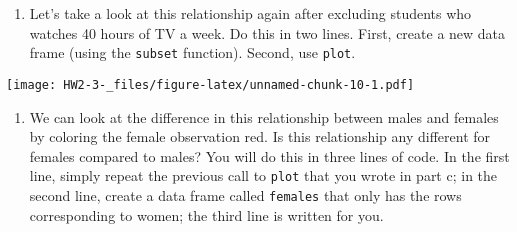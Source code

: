 \documentclass[]{article}
\newenvironment{Shaded}{\begin{snugshade}}{\end{snugshade}}
\newcommand{\CommentTok}[1]{\textcolor[rgb]{0.56,0.35,0.01}{\textit{#1}}}
\newcommand{\DataTypeTok}[1]{\textcolor[rgb]{0.13,0.29,0.53}{#1}}
\newcommand{\DecValTok}[1]{\textcolor[rgb]{0.00,0.00,0.81}{#1}}
\newcommand{\KeywordTok}[1]{\textcolor[rgb]{0.13,0.29,0.53}{\textbf{#1}}}
\newcommand{\NormalTok}[1]{#1}
\newcommand{\OperatorTok}[1]{\textcolor[rgb]{0.81,0.36,0.00}{\textbf{#1}}}
\newcommand{\StringTok}[1]{\textcolor[rgb]{0.31,0.60,0.02}{#1}}
\providecommand{\tightlist}{%
  \setlength{\itemsep}{0pt}\setlength{\parskip}{0pt}}
\begin{document}
\begin{enumerate}
\def\labelenumi{\alph{enumi})}
\setcounter{enumi}{2}
\tightlist
\item
  Let's take a look at this relationship again after excluding students
  who watches 40 hours of TV a week. Do this in two lines. First, create
  a new data frame (using the \texttt{subset} function). Second, use
  \texttt{plot}.
\end{enumerate}

\begin{Shaded}
\end{Shaded}

\texttt{[image: HW2-3-\_files/figure-latex/unnamed-chunk-10-1.pdf]}

\begin{enumerate}
\def\labelenumi{\alph{enumi})}
\setcounter{enumi}{3}
\tightlist
\item
  We can look at the difference in this relationship between males and
  females by coloring the female observation red. Is this relationship
  any different for females compared to males? You will do this in three
  lines of code. In the first line, simply repeat the previous call to
  \texttt{plot} that you wrote in part c; in the second line, create a
  data frame called \texttt{females} that only has the rows
  corresponding to women; the third line is written for you.
\end{enumerate}

\begin{Shaded}
\end{Shaded}
\end{document}
